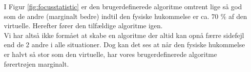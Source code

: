 I Figur \ref{fig:focusstatistic} er den brugerdefinerede algoritme omtrent lige så god som de andre (marginalt bedre) indtil den fysiske hukommelse er ca. 70 \% af den virtuelle. Herefter fører den tilfældige algoritme igen.\\

Vi har altså ikke formået at skabe en algoritme der altid kan opnå færre sidefejl end de 2 andre i alle situationer. Dog kan det ses at når den fysiske hukommelse er halvt så stor som den virtuelle, har vores brugerdefinerede algoritme førertrøjen marginalt.